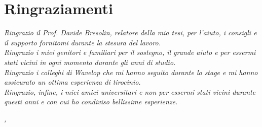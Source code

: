 
\cleardoublepage
{}
{}

\bigskip

\begingroup
\let\clearpage\relax
\let\cleardoublepage\relax
\let\cleardoublepage\relax

\chapter*{Ringraziamenti}

\noindent \textit{Ringrazio il Prof. Davide Bresolin, relatore della mia tesi, per l'aiuto, i consigli e il supporto fornitomi durante la stesura del lavoro.}\\

\noindent \textit{Ringrazio i miei genitori e familiari per il sostegno, il grande aiuto e per essermi stati vicini in ogni momento durante gli anni di studio.}\\

\noindent \textit{Ringrazio i colleghi di Wavelop che mi hanno seguito durante lo stage e mi hanno assicurato un ottima esperienza di tirocinio.}\\

\noindent \textit{Ringrazio, infine, i miei amici universitari e non per essermi stati vicini durante questi anni e con cui ho condiviso bellissime esperienze.}\\
\bigskip

\noindent\textit{\myLocation, \myTime}
\hfill \myName

\endgroup

